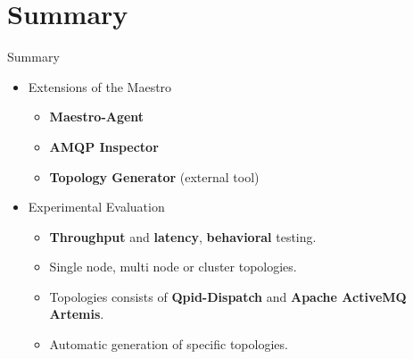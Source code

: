 \documentclass[hyperref={pdfpagelabels=false, unicode},pdf,slideColor,fyma,9pt]{beamer}
\begin{document}
		\section{Summary}
		\begin{frame}{Summary}
				\begin{itemize}
						\setlength\itemsep{0.5em}
						\item Extensions of the Maestro
						\vspace{0.5em}
						\begin{itemize}
							\setlength\itemsep{0.5em}
							\item \textbf{Maestro-Agent}
							\item \textbf{AMQP Inspector}
              \item \textbf{Topology Generator} (external tool)
						\end{itemize}
						\vspace{1em}
						\item Experimental Evaluation
						\vspace{0.5em}
						\begin{itemize}
							\setlength\itemsep{0.5em}
							\item \textbf{Throughput} and \textbf{latency}, \textbf{behavioral} testing.
              \item Single node, multi node or cluster topologies.
              \item Topologies consists of \textbf{Qpid-Dispatch} and \textbf{Apache ActiveMQ Artemis}.
              \item Automatic generation of specific topologies.
						\end{itemize}
				\end{itemize}
		\end{frame}
\end{document}
